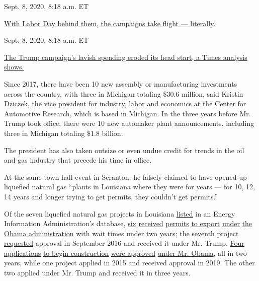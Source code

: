 Sept. 8, 2020, 8:18 a.m. ET

\href{https://www.nytimes3xbfgragh.onion/live/2020/09/08/us/trump-vs-biden\#with-labor-day-behind-them-the-campaigns-take-flight-literally}{With
Labor Day behind them, the campaigns take flight ---
literally.}\href{https://www.nytimes3xbfgragh.onion/live/2020/09/08/us/trump-vs-biden\#the-trump-campaigns-lavish-spending-eroded-its-head-start-a-times-analysis-shows}{}

Sept. 8, 2020, 8:18 a.m. ET

\href{https://www.nytimes3xbfgragh.onion/live/2020/09/08/us/trump-vs-biden\#the-trump-campaigns-lavish-spending-eroded-its-head-start-a-times-analysis-shows}{The
Trump campaign's lavish spending eroded its head start, a Times analysis
shows.}

Since 2017, there have been 10 new assembly or manufacturing investments
across the country, with three in Michigan totaling \$30.6 million, said
Kristin Dziczek, the vice president for industry, labor and economics at
the Center for Automotive Research, which is based in Michigan. In the
three years before Mr. Trump took office, there were 10 new automaker
plant announcements, including three in Michigan totaling \$1.8 billion.

The president has also taken outsize or even undue credit for trends in
the oil and gas industry that precede his time in office.

At the same town hall event in Scranton, he falsely claimed to have
opened up liquefied natural gas ``plants in Louisiana where they were
for years --- for 10, 12, 14 years and longer trying to get permits,
they couldn't get permits.''

Of the seven liquefied natural gas projects in Louisiana
\href{https://www.eia.gov/energyexplained/natural-gas/liquefied-natural-gas.php}{listed}
in an Energy Information Administration's database,
\href{https://fossil.energy.gov/ng_regulation/applications-2012-ceflng12123lng}{six}
\href{https://fossil.energy.gov/ng_regulation/applications-2013-lakecharleslngexport13-04-lng}{received}
\href{https://fossil.energy.gov/ng_regulation/applications-2012-magnolialngllc12-183-lng}{permits}
\href{https://fossil.energy.gov/ng_regulation/orders-2010-sabine10111dkt}{to
export}
\href{https://fossil.energy.gov/ng_regulation/applications-2013-venturegloballlc-13-69-lng1}{under}
\href{https://fossil.energy.gov/ng_regulation/applications-2011-cameron11-162-lngnfta}{the
Obama administration} with wait times under two years; the seventh
project
\href{https://www.energy.gov/sites/prod/files/2019/05/f62/ord4373.pdf}{requested}
approval in September 2016 and received it under Mr. Trump.
\href{https://elibrary.ferc.gov/IDMWS/file_list.asp?document_id=14431482}{Four
applications}
\href{https://elibrary.ferc.gov/IDMWS/file_list.asp?document_id=14449217}{to
begin construction}
\href{https://elibrary.ferc.gov/IDMWS/file_list.asp?document_id=14013209}{were
approved}
\href{https://elibrary.ferc.gov/IDMWS/file_list.asp?document_id=14227420}{under
Mr. Obama}, all in two years, while one project applied in 2015 and
received approval in 2019. The other two applied under Mr. Trump and
received it in three years.

